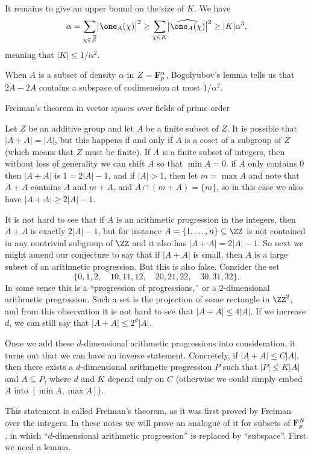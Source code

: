 It remains to give an upper bound on the size of $K$. We have
$$\alpha = \sum_{\chi\in \hat Z} \bigl| \one_A(\chi)\bigr|^2 \ge
\sum_{\chi\in K} \bigl|\hat{\one_A(\chi)}\bigr|^2 \ge |K|\alpha^3,$$
meaning that $|K|\le 1/\alpha^2$.\slug

When $A$ is a subset of density $\alpha$ in $Z = {\bf F}_p^n$, Bogolyubov's lemma tells us that $2A-2A$ contains
a subspace of codimension at most $1/\alpha^2$.

\advsect Freiman's theorem in vector spaces over fields of prime order

Let $Z$ be an additive group and let $A$ be a finite subset of $Z$. It is possible that $|A+A| = |A|$,
but this happens if and only if $A$ is a coset of a subgroup of $Z$ (which means that $Z$ must be finite).
If $A$ is a finite subset of integers, then without loss of generality we can shift $A$ so that $\min A = 0$.
if $A$ only contains $0$ then $|A+A|$ is $1 = 2|A|-1$, and if $|A| > 1$, then let $m = \max A$ and
note that $A+A$ contains $A$ and $m+A$, and $A\cap (m+A) = \{m\}$, so in this case we also have $|A+A|\ge 2|A|-1$.

It is not hard to see that if $A$ is an arithmetic progression
in the integers, then $A+A$ is exactly $2|A|-1$,
but for instance $A = \{1,\ldots,n\}\subseteq \ZZ$ is not contained in any nontrivial subgroup of $\ZZ$ and
it also has $|A+A| = 2|A|-1$.
So next we might amend our conjecture to say that if $|A+A|$ is small, then $A$ is a large subset of an arithmetic
progression. But this is also false. Consider the set
$$\{0,1,2,\quad 10,11,12,\quad 20,21,22,\quad 30,31,32\}.$$
In some sense this is a ``progression of progressions,'' or a $2$-dimensional arithmetic progression. Such
a set is the projection of some rectangle in $\ZZ^2$, and from this observation it is not hard to see
that $|A+A|\le 4|A|$. If we increase $d$, we can still say that $|A+A|\le 2^d|A|$.

Once we add these $d$-dimensional arithmetic progressions into consideration, it turns out that we can have
an inverse statement. Concretely, if $|A+A|\le C|A|$, then there exists a $d$-dimensional arithmetic
progression $P$ such that $|P|\le K|A|$ and $A\subseteq P$, where $d$ and $K$ depend only on $C$ (otherwise
we could simply embed $A$ into $[\min A, \max A]$).

This statement is called Freiman's theorem, as it was first proved by Freiman over the integers.
In these notes we will prove an analogue of it for subsets of ${\bf F}_p^N$, in which ``$d$-dimensional arithmetic
progression'' is replaced by ``subspace''. First we need a lemma.



